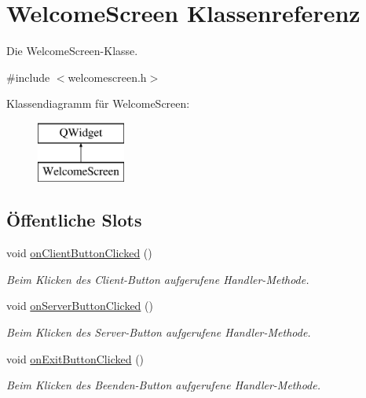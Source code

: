 \hypertarget{class_welcome_screen}{}\section{Welcome\+Screen Klassenreferenz}
\label{class_welcome_screen}


Die Welcome\+Screen-\/\+Klasse.  




{\ttfamily \#include $<$welcomescreen.\+h$>$}

Klassendiagramm für Welcome\+Screen\+:\begin{figure}[H]
\begin{center}
\leavevmode
\includegraphics[height=2.000000cm]{class_welcome_screen}
\end{center}
\end{figure}
\subsection*{Öffentliche Slots}
\begin{DoxyCompactItemize}
\item 
\hypertarget{class_welcome_screen_adccaa9a1534c67f1fcd43245ff689b9e}{}\label{class_welcome_screen_adccaa9a1534c67f1fcd43245ff689b9e} 
void \hyperlink{class_welcome_screen_adccaa9a1534c67f1fcd43245ff689b9e}{on\+Client\+Button\+Clicked} ()
\begin{DoxyCompactList}\small\item\em Beim Klicken des Client-\/\+Button aufgerufene Handler-\/\+Methode. \end{DoxyCompactList}\item 
\hypertarget{class_welcome_screen_ad4561643cb7feb6ad60e1daa097653d8}{}\label{class_welcome_screen_ad4561643cb7feb6ad60e1daa097653d8} 
void \hyperlink{class_welcome_screen_ad4561643cb7feb6ad60e1daa097653d8}{on\+Server\+Button\+Clicked} ()
\begin{DoxyCompactList}\small\item\em Beim Klicken des Server-\/\+Button aufgerufene Handler-\/\+Methode. \end{DoxyCompactList}\item 
\hypertarget{class_welcome_screen_a587ba35bfff39970d795906f253a52f8}{}\label{class_welcome_screen_a587ba35bfff39970d795906f253a52f8} 
void \hyperlink{class_welcome_screen_a587ba35bfff39970d795906f253a52f8}{on\+Exit\+Button\+Clicked} ()
\begin{DoxyCompactList}\small\item\em Beim Klicken des Beenden-\/\+Button aufgerufene Handler-\/\+Methode. \end{DoxyCompactList}\end{DoxyCompactItemize}
